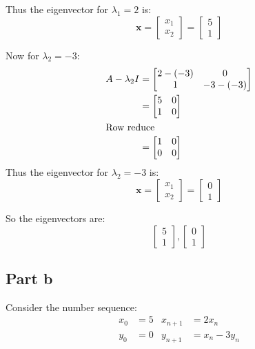 Thus the eigenvector for $\lambda_1 = 2$ is:
\[
	\mathbf{x}=\begin{bmatrix}x_1\\x_2\end{bmatrix}=\begin{bmatrix}5\\1\end{bmatrix}
\]

Now for $\lambda_2 = -3$:
\begin{align*}
	A - \lambda_2 I & = \begin{bmatrix}
		                    2-(-3) & 0       \\
		                    1      & -3-(-3)
	                    \end{bmatrix} \\
	                & = \begin{bmatrix}
		                    5 & 0 \\
		                    1 & 0
	                    \end{bmatrix}   \\
	\intertext{Row reduce}
	                & = \begin{bmatrix}
		                    1 & 0 \\
		                    0 & 0
	                    \end{bmatrix}
\end{align*}
Thus the eigenvector for $\lambda_2 = -3$ is:
\[
	\mathbf{x}=\begin{bmatrix}x_1\\x_2\end{bmatrix}=\begin{bmatrix}0\\1\end{bmatrix}
\]

So the eigenvectors are:
\[
	\begin{bmatrix}5\\1\end{bmatrix}, \begin{bmatrix}0\\1\end{bmatrix}
\]

\subsection{Part b}
Consider the number sequence:
\begin{align*}
	x_0 & = 5 & x_{n+1} & = 2x_n       \\
	y_0 & = 0 & y_{n+1} & = x_n - 3y_n \\
\end{align*}


